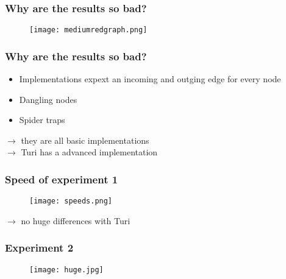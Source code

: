 \begin{frame}
\frametitle{Why are the results so bad?}
\begin{figure}

	\texttt{[image: mediumredgraph.png]}

\end{figure}
\end{frame}


\begin{frame}
\frametitle{Why are the results so bad?}
\begin{itemize}
\item Implementations expext an incoming and outging edge for every node
\item Dangling nodes
\item Spider traps
\end{itemize}

$\rightarrow$ they are all basic implementations\\
$\rightarrow$ Turi has a advanced implementation
\end{frame}


\begin{frame}
\frametitle{Speed of experiment 1}
\begin{figure}

	\texttt{[image: speeds.png]}

\end{figure}
$\rightarrow$ no huge differences with Turi
\end{frame}

\begin{frame}
\frametitle{Experiment 2}
\begin{figure}

	\texttt{[image: huge.jpg]}

\end{figure}

\end{frame}

